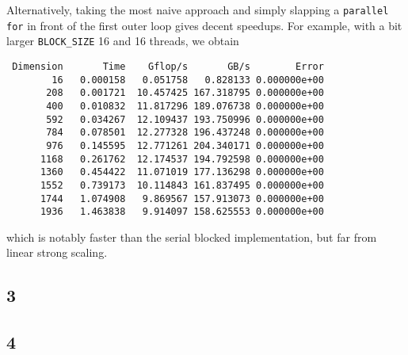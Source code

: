 \documentclass{article}
\begin{document}
Alternatively, taking the most naive approach and simply slapping a
\texttt{parallel for} in front of the first outer loop gives decent speedups.
For example, with a bit larger \texttt{BLOCK\_SIZE} 16 and 16 threads, we obtain 
\begin{verbatim}
 Dimension       Time    Gflop/s       GB/s        Error
        16   0.000158   0.051758   0.828133 0.000000e+00
       208   0.001721  10.457425 167.318795 0.000000e+00
       400   0.010832  11.817296 189.076738 0.000000e+00
       592   0.034267  12.109437 193.750996 0.000000e+00
       784   0.078501  12.277328 196.437248 0.000000e+00
       976   0.145595  12.771261 204.340171 0.000000e+00
      1168   0.261762  12.174537 194.792598 0.000000e+00
      1360   0.454422  11.071019 177.136298 0.000000e+00
      1552   0.739173  10.114843 161.837495 0.000000e+00
      1744   1.074908   9.869567 157.913073 0.000000e+00
      1936   1.463838   9.914097 158.625553 0.000000e+00
\end{verbatim}
which is notably faster than the serial blocked implementation, but far from
linear strong scaling.

\subsection*{3}

\subsection*{4}
\end{document}
